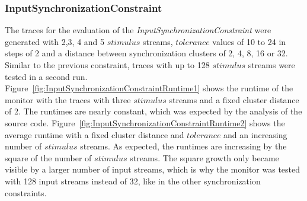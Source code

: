 \subsubsection{InputSynchronizationConstraint}
The traces for the evaluation of the \textit{InputSynchronizationConstraint} were generated with 2,3, 4 and 5 $stimulus$ streams, $tolerance$ values of 10 to 24 in steps of 2 and a distance between synchronization clusters of 2, 4, 8, 16 or 32. Similar to the previous constraint, traces with up to 128 $stimulus$ streams were tested in a second run.\\
Figure~\ref{fig:InputSynchronizationConstraintRuntime1} shows the runtime of the monitor with the traces with three $stimulus$ streams and a fixed cluster distance of 2. The runtimes are nearly constant, which was expected by the analysis of the source code. Figure~\ref{fig:InputSynchronizationConstraintRuntime2} shows the average runtime with a fixed cluster distance and $tolerance$ and an increasing number of $stimulus$ streams. As expected, the runtimes are increasing by the square of the number of $stimulus$ streams. The square growth only became visible by a larger number of input streams, which is why the monitor was tested with 128 input streams instead of 32, like in the other synchronization constraints.

